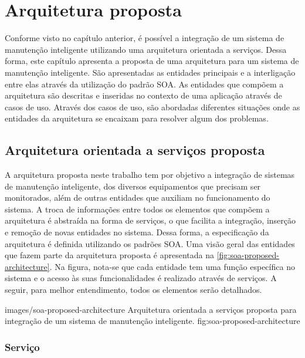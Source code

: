 \chapter{Arquitetura proposta}

Conforme visto no capítulo anterior, é possível a integração de um sistema de manutenção inteligente
utilizando uma arquitetura orientada a serviços. Dessa forma, este capítulo apresenta a proposta de
uma arquitetura para um sistema de manutenção inteligente. São apresentadas as entidades principais
e a interligação entre elas através da utilização do padrão \gls{SOA}. As entidades que compõem a
arquitetura são descritas e inseridas no contexto de uma aplicação através de casos de uso. Através
dos casos de uso, são abordadas diferentes situações onde as entidades da arquitetura se encaixam
para resolver algum dos problemas.

\blindtext



\section{Arquitetura orientada a serviços proposta}

A arquitetura proposta neste trabalho tem por objetivo a integração de sistemas de manutenção
inteligente, dos diversos equipamentos que precisam ser monitorados, além de outras entidades que
auxiliam no funcionamento do sistema. A troca de informações entre todos os elementos que compõem a
arquitetura é abstraída na forma de serviços, o que facilita a integração, inserção e remoção de
novas entidades no sistema. Dessa forma, a especificação da arquitetura é definida utilizando os
padrões \gls{SOA}. Uma visão geral das entidades que fazem parte da arquitetura proposta é
apresentada na \cref{fig:soa-proposed-architecture}. Na figura, nota-se que cada entidade tem uma função específica no sistema
e o acesso às suas funcionalidades é realizado através de serviços. A seguir, para melhor
entendimento, todos os elementos serão detalhados.

  {images/soa-proposed-architecture}
  {Arquitetura orientada a serviços proposta para integração de um sistema de manutenção
      inteligente.}
  {fig:soa-proposed-architecture}


\subsection{Serviço}

